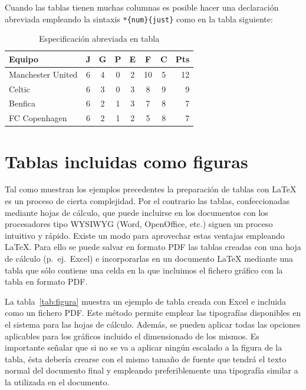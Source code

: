 \documentclass[11pt,a4paper]{article}
\begin{document}
Cuando las tablas tienen muchas columnas es posible hacer una declaración abreviada empleando la sintaxis \texttt{*\{num\}\{just\}} como en la tabla siguiente:

\begin{table}[H]%
	\centering
	\caption{Especificación abreviada en tabla}
	\label{tab:abreviada}
	\begin{tabular}{l*{6}{c}|r}
	Equipo            & J & G & P & E & F  & C & Pts \\
	\hline
	Manchester United & 6 & 4 & 0 & 2 & 10 & 5 & 12  \\
	Celtic            & 6 & 3 & 0 & 3 &  8 & 9 &  9  \\
	Benfica           & 6 & 2 & 1 & 3 &  7 & 8 &  7  \\
	FC Copenhagen     & 6 & 2 & 1 & 2 &  5 & 8 &  7  \\
	\end{tabular}
\end{table}







\section{Tablas incluidas como figuras}
Tal como muestran los ejemplos precedentes la preparación de tablas con \LaTeX{} es un proceso de cierta complejidad. Por el contrario las tablas, confeccionadas mediante hojas de cálculo, que puede incluirse en los documentos con los procesadores tipo \textsc{WYSIWYG} (\textsf{Word}, \textsf{OpenOffice}, etc.) siguen un proceso intuitivo y rápido. Existe un modo para aprovechar estas ventajas empleando \LaTeX{}. Para ello se puede salvar en formato \textsf{PDF} las tablas creadas con una hoja de cálculo (p.~ej.\ \textsf{Excel}) e incorporarlas en un documento \LaTeX{} mediante una tabla que sólo contiene una celda en la que incluimos el fichero gráfico con la tabla en formato \textsf{PDF}. 

La tabla~\ref{tab:figura} muestra un ejemplo de tabla creada con \textsf{Excel} e incluida como un fichero \textsf{PDF}. Este método permite emplear las tipografías disponibles en el sistema para las hojas de cálculo. Además, se pueden aplicar todas las opciones aplicables para los gráficos incluido el dimensionado de los mismos. Es importante señalar que si no se va a aplicar ningún escalado a la figura de la tabla, ésta debería crearse con el mismo tamaño de fuente que tendrá el texto normal del documento final y empleando preferiblemente una tipografía similar a la utilizada en el documento.
\end{document}
